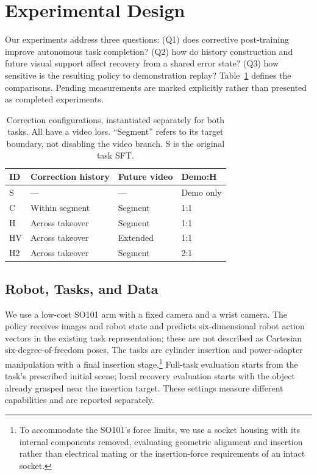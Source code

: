 \documentclass[letterpaper,10pt,conference]{ieeeconf}
\begin{document}
\section{Experimental Design}
Our experiments address three questions: (Q1) does corrective post-training improve autonomous task completion? (Q2) how do history construction and future visual support affect recovery from a shared error state? (Q3) how sensitive is the resulting policy to demonstration replay? Table~\ref{tab:configs} defines the comparisons. Pending measurements are marked explicitly rather than presented as completed experiments.

\begin{table}[t]
\centering\small
\caption{Correction configurations, instantiated separately for both tasks. All have a video loss. ``Segment'' refers to its target boundary, not disabling the video branch. S is the original task SFT.}
\label{tab:configs}
\begin{tabular}{llll}
\toprule
ID & Correction history & Future video & Demo:H \\
\midrule
S & --- & --- & Demo only \\
C & Within segment & Segment & 1:1 \\
H & Across takeover & Segment & 1:1 \\
HV & Across takeover & Extended & 1:1 \\
H2 & Across takeover & Segment & 2:1 \\
\bottomrule
\end{tabular}
\end{table}

\subsection{Robot, Tasks, and Data}
We use a low-cost SO101 arm with a fixed camera and a wrist camera. The policy receives images and robot state and predicts six-dimensional robot action vectors in the existing task representation; these are not described as Cartesian six-degree-of-freedom poses. The tasks are cylinder insertion and power-adapter manipulation with a final insertion stage.\footnote{To accommodate the SO101's force limits, we use a socket housing with its internal components removed, evaluating geometric alignment and insertion rather than electrical mating or the insertion-force requirements of an intact socket.} Full-task evaluation starts from the task's prescribed initial scene; local recovery evaluation starts with the object already grasped near the insertion target. These settings measure different capabilities and are reported separately.
\end{document}
